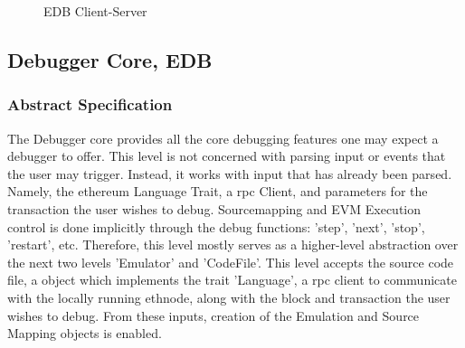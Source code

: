 \documentclass{report}
\begin{document}
    \begin{figure}[h]
        \centering
        \caption{EDB Client-Server}
    \end{figure}

\subsection{Debugger Core, EDB}
    \subsubsection{Abstract Specification}
        The Debugger core provides all the core debugging features one may expect a debugger to offer. This level is not concerned with parsing input or events that the user may trigger. Instead, it works with input that has already been parsed. Namely, the \Gls{ethereum} Language Trait, a \Gls{rpc} Client, and parameters for the transaction the user wishes to debug. Sourcemapping and EVM Execution control is done implicitly through the debug functions: 'step', 'next', 'stop', 'restart', etc. Therefore, this level mostly serves as a higher-level abstraction over the next two levels 'Emulator' and 'CodeFile'. This level accepts the source code file, a object which implements the trait 'Language', a \Gls{rpc} client to communicate with the locally running \Gls{ethnode}, along with the block and transaction the user wishes to debug. From these inputs, creation of the Emulation and Source Mapping objects is enabled.
\end{document}
